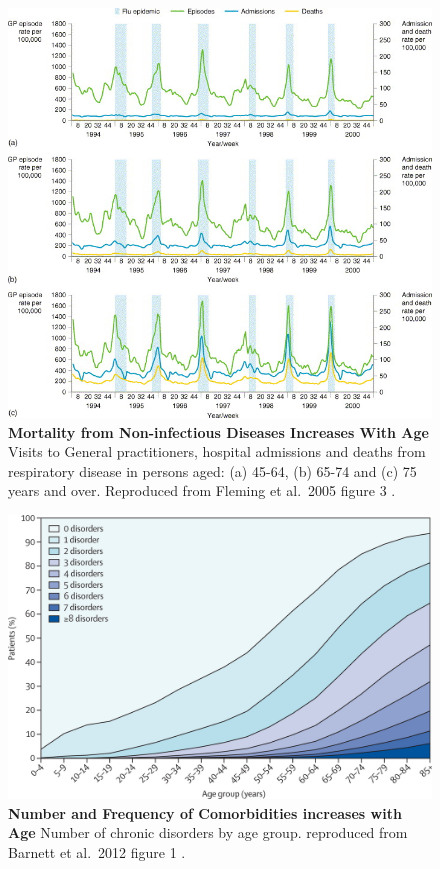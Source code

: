 \documentclass[
]{book}
\begin{document}
\begin{figure}

{\centering \includegraphics[width=0.8\linewidth]{figs/Fleming2005_fig3} 

}

\caption{\textbf{Mortality from Non-infectious Diseases Increases With Age} Visits to General practitioners, hospital admissions and deaths from respiratory disease in persons aged: (a) 45-64, (b) 65-74 and (c) 75 years and over. Reproduced from Fleming et al.~2005 figure 3 \citep{Fleming2005}.}\label{fig:Fleming2005-fig3}
\end{figure}



\begin{figure}

{\centering \includegraphics[width=0.8\linewidth]{figs/Barnett2012_fig1} 

}

\caption{\textbf{Number and Frequency of Comorbidities increases with Age} Number of chronic disorders by age group. reproduced from Barnett et al.~2012 figure 1 \citep{Barnett2012}.}\label{fig:Barnett2012-fig1}
\end{figure}
\end{document}
